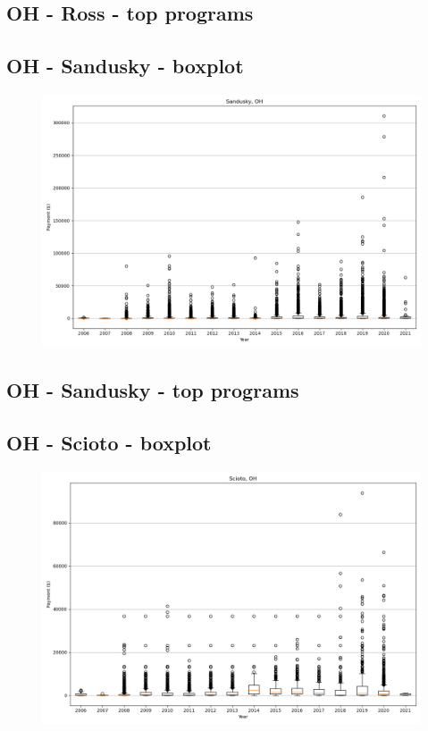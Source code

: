 \subsection*{OH - Ross - top programs}

\newpage
\subsection*{OH - Sandusky - boxplot}
\begin{figure}[h]
\centering
\includegraphics[width=7in]{../output/boxplots/counties/Sandusky-OH_boxplot.png}
\end{figure}


\subsection*{OH - Sandusky - top programs}

\newpage
\subsection*{OH - Scioto - boxplot}
\begin{figure}[h]
\centering
\includegraphics[width=7in]{../output/boxplots/counties/Scioto-OH_boxplot.png}
\end{figure}


